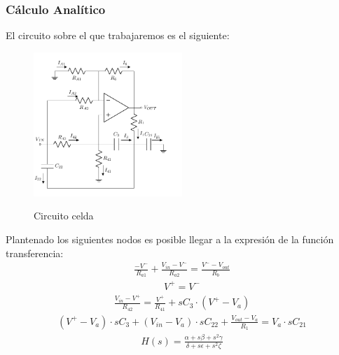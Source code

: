 \subsubsection{Cálculo Analítico}
El circuito sobre el que trabajaremos es el siguiente:
\begin{figure}[H]
	\centering
	\includegraphics[width=0.5\textwidth]{Imagenes-Ej3/CircuitoDeGuido.pdf}
	\label{fig:HPBSedrac}
	\caption{Circuito celda}
\end{figure}
Plantenado los siguientes nodos es posible llegar a la expresión de la función transferencia:
\begin{align}
\frac{-V^-}{R_{a1}}+\frac{V_{in}-V^-}{R_{a2}}=\frac{V^--V_{out}}{R_b}
\end{align}
\begin{align}
V^+=V^-
\end{align}
\begin{align}
\frac{V_{in}-V^+}{R_{42}}=\frac{V^+}{R_{41}}+sC_3\cdot (V^+-V_a)
\end{align}
\begin{align}
(V^+-V_a)\cdot sC_3 + (V_{in}-V_a)\cdot sC_{22}+\frac{V_{out}-V_a}{R_1}=V_a\cdot sC_{21}
\end{align}
\begin{align}
H(s)=
{\frac { \alpha +s \beta +{s}^{2} \gamma }{\delta+s \epsilon +{s}^{2} \zeta }
}
\end{align}


